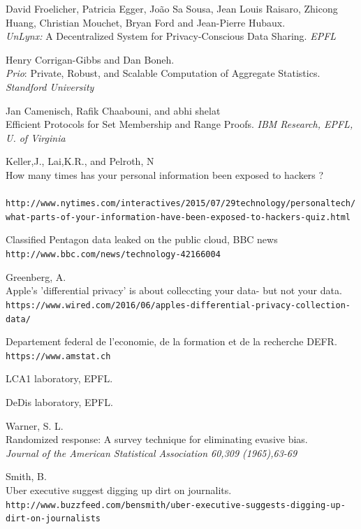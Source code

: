 \documentclass{article}
\begin{document}
\newpage
\begin{thebibliography}{9}

David Froelicher, Patricia Egger, João Sa Sousa, Jean Louis Raisaro, Zhicong Huang, Christian Mouchet, Bryan Ford and Jean-Pierre Hubaux.\\
\textit{UnLynx:} A Decentralized System for Privacy-Conscious Data Sharing. 
\textit{EPFL}
 
Henry Corrigan-Gibbs and Dan Boneh.\\
\textit{Prio}: Private, Robust, and Scalable Computation of Aggregate Statistics.
\textit{Standford University}


Jan Camenisch, Rafik Chaabouni, and abhi shelat\\
Efficient Protocols for Set Membership and Range Proofs.
\textit{IBM Research, EPFL, U. of Virginia}

Keller,J., Lai,K.R., and Pelroth, N\\
How many times has your personal information been exposed to hackers ?\\
\\\texttt{http://www.nytimes.com/interactives/2015/07/29technology/personaltech/what-parts-of-your-information-have-been-exposed-to-hackers-quiz.html}

Classified Pentagon data leaked on the public cloud, BBC news
\\\texttt{http://www.bbc.com/news/technology-42166004}

Greenberg, A.\\
Apple's 'differential privacy' is about colleccting your data- but not your data.
\\\texttt{https://www.wired.com/2016/06/apples-differential-privacy-collection-data/}

Departement federal de l'economie, de la formation et de la recherche DEFR.
\\\texttt{https://www.amstat.ch}

LCA1 laboratory, EPFL.

DeDis laboratory, EPFL.

Warner, S. L.\\
Randomized response: A survey technique for eliminating evasive bias.\\
\textit{Journal of the American Statistical Association 60,309 (1965),63-69}

Smith, B.\\
Uber executive suggest digging up dirt on journalits.
\\\texttt{http://www.buzzfeed.com/bensmith/uber-executive-suggests-digging-up-dirt-on-journalists}


\end{thebibliography}
\end{document}
